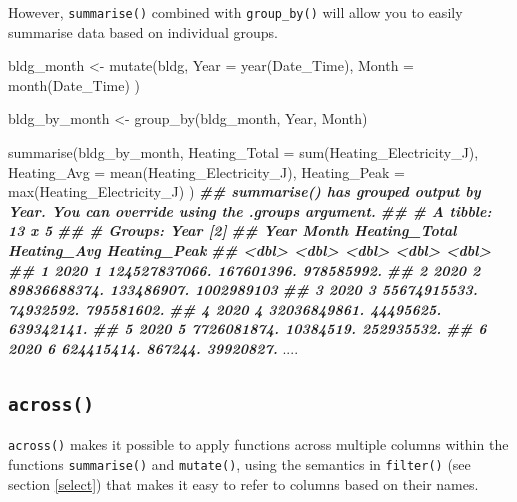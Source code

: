 \documentclass[
]{book}
\newenvironment{Shaded}{\begin{snugshade}}{\end{snugshade}}
\newcommand{\AttributeTok}[1]{\textcolor[rgb]{0.77,0.63,0.00}{#1}}
\newcommand{\DocumentationTok}[1]{\textcolor[rgb]{0.56,0.35,0.01}{\textbf{\textit{#1}}}}
\newcommand{\FunctionTok}[1]{\textcolor[rgb]{0.00,0.00,0.00}{#1}}
\newcommand{\NormalTok}[1]{#1}
\newcommand{\OtherTok}[1]{\textcolor[rgb]{0.56,0.35,0.01}{#1}}
\begin{document}
However, \texttt{summarise()} combined with \texttt{group\_by()} will allow you to easily summarise data based on individual groups.

\begin{Shaded}
\begin{Highlighting}[]
\NormalTok{bldg\_month }\OtherTok{\textless{}{-}} \FunctionTok{mutate}\NormalTok{(bldg,}
  \AttributeTok{Year =} \FunctionTok{year}\NormalTok{(Date\_Time),}
  \AttributeTok{Month =} \FunctionTok{month}\NormalTok{(Date\_Time)}
\NormalTok{)}

\NormalTok{bldg\_by\_month }\OtherTok{\textless{}{-}} \FunctionTok{group\_by}\NormalTok{(bldg\_month, Year, Month)}

\FunctionTok{summarise}\NormalTok{(bldg\_by\_month,}
  \AttributeTok{Heating\_Total =} \FunctionTok{sum}\NormalTok{(Heating\_Electricity\_J),}
  \AttributeTok{Heating\_Avg =} \FunctionTok{mean}\NormalTok{(Heating\_Electricity\_J),}
  \AttributeTok{Heating\_Peak =} \FunctionTok{max}\NormalTok{(Heating\_Electricity\_J)}
\NormalTok{)}
\DocumentationTok{\#\# \textasciigrave{}summarise()\textasciigrave{} has grouped output by \textquotesingle{}Year\textquotesingle{}. You can override using the \textasciigrave{}.groups\textasciigrave{} argument.}
\DocumentationTok{\#\# \# A tibble: 13 x 5}
\DocumentationTok{\#\# \# Groups:   Year [2]}
\DocumentationTok{\#\#     Year Month Heating\_Total Heating\_Avg Heating\_Peak}
\DocumentationTok{\#\#    \textless{}dbl\textgreater{} \textless{}dbl\textgreater{}         \textless{}dbl\textgreater{}       \textless{}dbl\textgreater{}        \textless{}dbl\textgreater{}}
\DocumentationTok{\#\#  1  2020     1 124527837066.  167601396.   978585992.}
\DocumentationTok{\#\#  2  2020     2  89836688374.  133486907.  1002989103 }
\DocumentationTok{\#\#  3  2020     3  55674915533.   74932592.   795581602.}
\DocumentationTok{\#\#  4  2020     4  32036849861.   44495625.   639342141.}
\DocumentationTok{\#\#  5  2020     5   7726081874.   10384519.   252935532.}
\DocumentationTok{\#\#  6  2020     6    624415414.     867244.    39920827.}
\NormalTok{....}
\end{Highlighting}
\end{Shaded}

\hypertarget{across}{%
\subsection{\texorpdfstring{\texttt{across()}}{across()}}\label{across}}

\texttt{across()} makes it possible to apply functions across multiple columns within the functions \texttt{summarise()} and \texttt{mutate()}, using the semantics in \texttt{filter()} (see section \ref{select}) that makes it easy to refer to columns based on their names.
\end{document}
